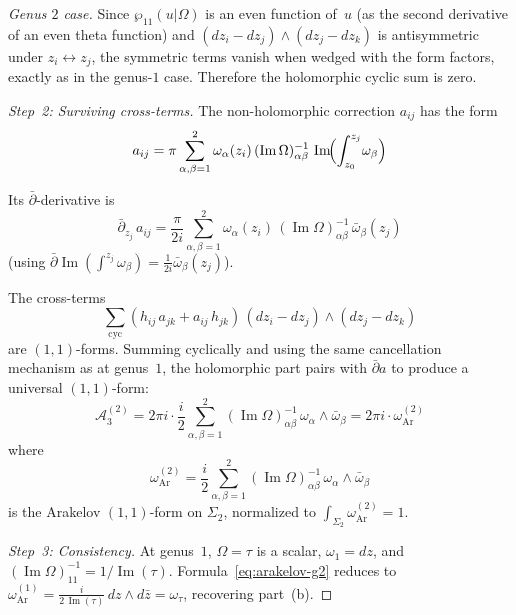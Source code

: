 \begin{proof}[Genus $2$ case]
Since $\wp_{11}(u|\Omega)$ is an even function of~$u$ (as the second
derivative of an even theta function) and
$(dz_i - dz_j) \wedge (dz_j - dz_k)$ is antisymmetric under
$z_i \leftrightarrow z_j$, the symmetric terms vanish when wedged
with the form factors, exactly as in the genus-$1$ case.
Therefore the holomorphic cyclic sum is zero.

\emph{Step~2: Surviving cross-terms.}
The non-holomorphic correction $a_{ij}$ has the form
\begin{equation}
a_{ij} = \pi \sum_{\alpha,\beta=1}^{2}
  \omega_\alpha(z_i)\,(\operatorname{Im}\Omega)^{-1}_{\alpha\beta}\,
  \operatorname{Im}\!\Bigl(\int_{z_0}^{z_j}\!\omega_\beta\Bigr)
\end{equation}

Its $\bar\partial$-derivative is
\begin{equation}\label{eq:dbar-a-g2}
\bar\partial_{z_j}\, a_{ij}
= \frac{\pi}{2i} \sum_{\alpha,\beta=1}^{2}
  \omega_\alpha(z_i)\,(\operatorname{Im}\Omega)^{-1}_{\alpha\beta}\,
  \bar\omega_\beta(z_j)
\end{equation}
(using $\bar\partial \operatorname{Im}(\int^{z_j}\omega_\beta)
= \frac{1}{2i}\bar\omega_\beta(z_j)$).

The cross-terms
\[
\sum_{\mathrm{cyc}} (h_{ij}\,a_{jk} + a_{ij}\,h_{jk})
\,(dz_i - dz_j) \wedge (dz_j - dz_k)
\]
are $(1,1)$-forms.  Summing cyclically and using the same cancellation
mechanism as at genus~$1$, the holomorphic part pairs with
$\bar\partial a$ to produce a universal $(1,1)$-form:
\begin{equation}\label{eq:arnold-g2-result}
\mathcal{A}_3^{(2)} = 2\pi i \cdot
\frac{i}{2}\sum_{\alpha,\beta=1}^{2}
  (\operatorname{Im}\Omega)^{-1}_{\alpha\beta}\,
  \omega_\alpha \wedge \bar\omega_\beta
= 2\pi i \cdot \omega_{\mathrm{Ar}}^{(2)}
\end{equation}
where
\begin{equation}\label{eq:arakelov-g2}
\omega_{\mathrm{Ar}}^{(2)}
= \frac{i}{2}\sum_{\alpha,\beta=1}^{2}
  (\operatorname{Im}\Omega)^{-1}_{\alpha\beta}\,
  \omega_\alpha \wedge \bar\omega_\beta
\end{equation}
is the Arakelov $(1,1)$-form on $\Sigma_2$, normalized to
$\int_{\Sigma_2} \omega_{\mathrm{Ar}}^{(2)} = 1$.

\emph{Step~3: Consistency.}
At genus~$1$, $\Omega = \tau$ is a scalar, $\omega_1 = dz$, and
$(\operatorname{Im}\Omega)^{-1}_{11} = 1/\operatorname{Im}(\tau)$.
Formula~\eqref{eq:arakelov-g2} reduces to
$\omega_{\mathrm{Ar}}^{(1)}
= \frac{i}{2\,\operatorname{Im}(\tau)}\,dz \wedge d\bar{z}
= \omega_\tau$,
recovering part~(b).
\end{proof}

